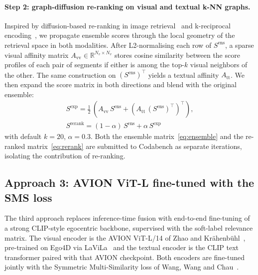 \paragraph{Step 2: graph-diffusion re-ranking on visual and textual k-NN graphs.}
Inspired by diffusion-based re-ranking in image retrieval~\cite{iscen2017diffusion} and k-reciprocal encoding~\cite{zhong2017kreciprocal}, we propagate ensemble scores through the local geometry of the retrieval space in both modalities. After L2-normalising each row of $S^{\mathrm{ens}}$, a sparse visual affinity matrix $A_{\mathrm{vv}} \in \mathbb{R}^{N_v\times N_v}$ stores cosine similarity between the score profiles of each pair of segments if either is among the top-$k$ visual neighbors of the other. The same construction on $(S^{\mathrm{ens}})^{\!\top}$ yields a textual affinity $A_{\mathrm{tt}}$. We then expand the score matrix in both directions and blend with the original ensemble:
\begin{gather}
S^{\mathrm{exp}} = \tfrac{1}{2}\,(A_{\mathrm{vv}}\,S^{\mathrm{ens}} + (A_{\mathrm{tt}}\,(S^{\mathrm{ens}})^{\!\top})^{\!\top}),\\
S^{\mathrm{rerank}} = (1-\alpha)\,S^{\mathrm{ens}} + \alpha\,S^{\mathrm{exp}}
\label{eq:rerank}
\end{gather}
with default $k=20$, $\alpha=0.3$. Both the ensemble matrix~\eqref{eq:ensemble} and the re-ranked matrix~\eqref{eq:rerank} are submitted to Codabench as separate iterations, isolating the contribution of re-ranking.

\subsection{Approach 3: AVION ViT-L fine-tuned with the SMS loss}
\label{sec:methods:avion}

The third approach replaces inference-time fusion with end-to-end fine-tuning of a strong CLIP-style egocentric backbone, supervised with the soft-label relevance matrix. The visual encoder is the AVION ViT-L/14 of Zhao and Kr\"ahenb\"uhl~\cite{zhao2023avion}, pre-trained on Ego4D via LaViLa~\cite{zhao2023lavila} and the textual encoder is the CLIP text transformer paired with that AVION checkpoint. Both encoders are fine-tuned jointly with the Symmetric Multi-Similarity loss of Wang, Wang and Chau~\cite{wang2024symmetricmultisimilaritylossepickitchens100}.

